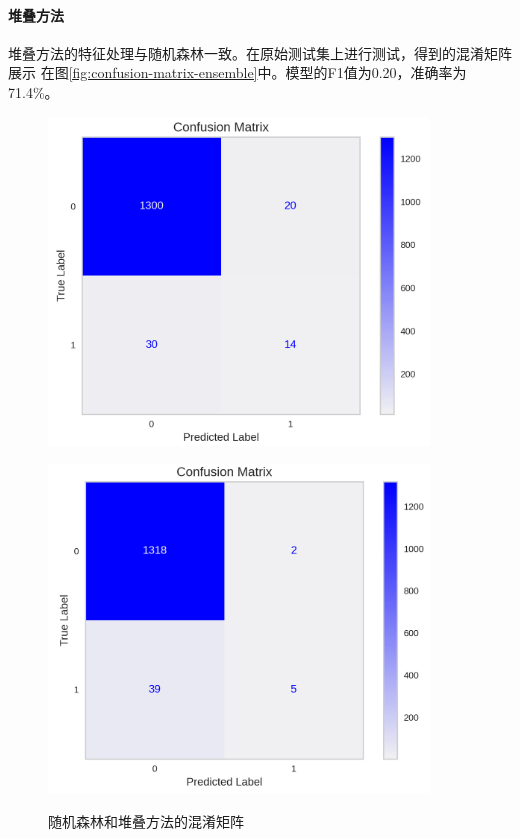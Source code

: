 \paragraph{堆叠方法}
堆叠方法的特征处理与随机森林一致。在原始测试集上进行测试，得到的混淆矩阵展示
在图\ref{fig:confusion-matrix-ensemble}中。模型的F1值为0.20，准确率为
71.4\%。
\begin{figure}[ht]
    \centering
    \begin{minipage}[c]{0.45\textwidth}
        \centering
        \includegraphics[width=0.9\textwidth]{images/random_forest_confusion_matrix_unbalanced.png}
        \label{fig:confusion-matrix-random-forest}
    \end{minipage}
    \begin{minipage}[c]{0.45\textwidth}
        \centering
        \includegraphics[width=0.9\textwidth]{images/ensemble_confusion_maxtrix_unbalanced.png}
        \label{fig:confusion-matrix-ensemble}
    \end{minipage}
    \caption{随机森林和堆叠方法的混淆矩阵}
    \label{fig:confusion-mat}
\end{figure}